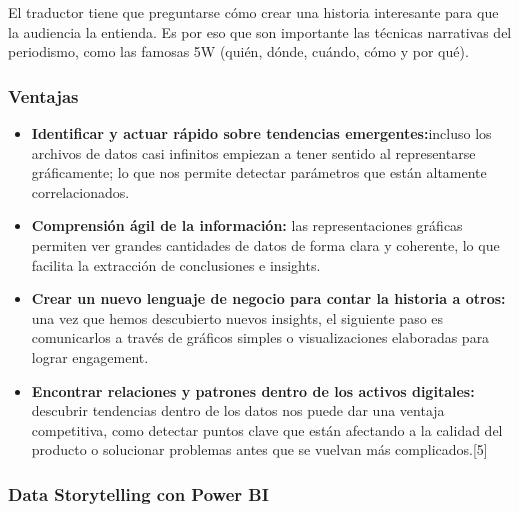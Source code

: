 \documentclass[twoside,twocolumn]{article}
\begin{document}
El traductor tiene que preguntarse cómo crear una historia interesante para que la audiencia la entienda. Es por eso que son importante las técnicas narrativas del periodismo, como las famosas 5W (quién, dónde, cuándo, cómo y por qué).

\subsubsection{Ventajas}
\begin{itemize}
	\item \textbf{Identificar y actuar rápido sobre tendencias emergentes:}incluso los archivos de datos casi infinitos empiezan a tener sentido al representarse gráficamente; lo que nos permite detectar parámetros que están altamente correlacionados.
	\item \textbf{Comprensión ágil de la información:} las representaciones gráficas permiten ver grandes cantidades de datos de forma clara y coherente, lo que facilita la extracción de conclusiones e insights.
	\item \textbf{Crear un nuevo lenguaje de negocio para contar la historia a otros:} una vez que hemos descubierto nuevos insights, el siguiente paso es comunicarlos a través de gráficos simples o visualizaciones elaboradas para lograr engagement. 
	\item \textbf{Encontrar relaciones y patrones dentro de los activos digitales:} descubrir tendencias dentro de los datos nos puede dar una ventaja competitiva, como detectar puntos clave que están afectando a la calidad del producto o solucionar problemas antes que se vuelvan más complicados.[5]
\end{itemize}
\subsubsection{Data Storytelling con Power BI}
\end{document}
